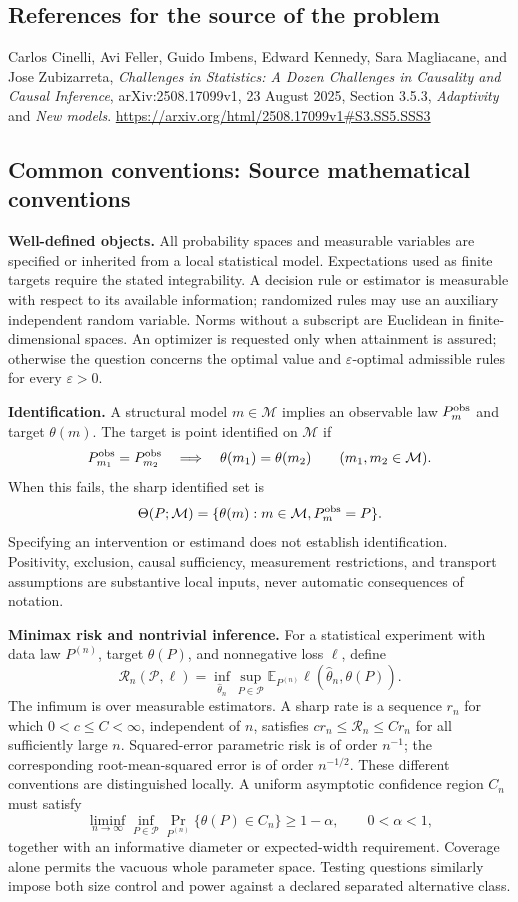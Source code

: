 \documentclass[11pt,a4paper]{article}
\newcommand{\E}{\mathbb E}
\begin{document}
\subsection*{References for the source of the problem}
Carlos Cinelli, Avi Feller, Guido Imbens, Edward Kennedy, Sara Magliacane, and Jose Zubizarreta, \emph{Challenges in Statistics: A Dozen Challenges in Causality and Causal Inference}, arXiv:2508.17099v1, 23 August 2025, Section 3.5.3, \emph{Adaptivity} and \emph{New models}.
\url{https://arxiv.org/html/2508.17099v1#S3.SS5.SSS3}

\subsection*{Common conventions: Source mathematical conventions}

\textbf{Well-defined objects.}
All probability spaces and measurable variables are specified or inherited
from a local statistical model. Expectations used as finite targets require
the stated integrability. A decision rule or estimator is measurable with
respect to its available information; randomized rules may use an auxiliary
independent random variable. Norms without a subscript are Euclidean in
finite-dimensional spaces. An optimizer is requested only when attainment
is assured; otherwise the question concerns the optimal value and
$\varepsilon$-optimal admissible rules for every $\varepsilon>0$.

\textbf{Identification.}
A structural model $m\in\mathcal M$ implies an observable law
$P_m^{\rm obs}$ and target $\theta(m)$. The target is point identified on
$\mathcal M$ if
\[
 P_{m_1}^{\rm obs}=P_{m_2}^{\rm obs}
 \quad\Longrightarrow\quad\theta(m_1)=\theta(m_2)
 \qquad(m_1,m_2\in\mathcal M).
\]
When this fails, the sharp identified set is
\[
 \Theta(P;\mathcal M)=\{\theta(m):m\in\mathcal M,
                                  P_m^{\rm obs}=P\}.
\]
Specifying an intervention or estimand does not establish identification.
Positivity, exclusion, causal sufficiency, measurement restrictions, and
transport assumptions are substantive local inputs, never automatic
consequences of notation.

\textbf{Minimax risk and nontrivial inference.}
For a statistical experiment with data law $P^{(n)}$, target $\theta(P)$,
and nonnegative loss $\ell$, define
\[
 \mathcal R_n(\mathcal P,\ell)
   =\inf_{\widehat\theta_n}\sup_{P\in\mathcal P}
      \E_{P^{(n)}}\ell(\widehat\theta_n,\theta(P)).
\]
The infimum is over measurable estimators. A sharp rate is a sequence
$r_n$ for which $0<c\leq C<\infty$, independent of $n$, satisfies
$c r_n\leq\mathcal R_n\leq C r_n$ for all sufficiently large $n$.
Squared-error parametric risk is of order $n^{-1}$; the corresponding
root-mean-squared error is of order $n^{-1/2}$. These different conventions
are distinguished locally. A uniform asymptotic confidence region $C_n$
must satisfy
\[
 \liminf_{n\to\infty}\inf_{P\in\mathcal P}
     \Pr_{P^{(n)}}\{\theta(P)\in C_n\}\geq 1-\alpha,
 \qquad 0<\alpha<1,
\]
together with an informative diameter or expected-width requirement.
Coverage alone permits the vacuous whole parameter space. Testing questions
similarly impose both size control and power against a declared separated
alternative class.
\end{document}
